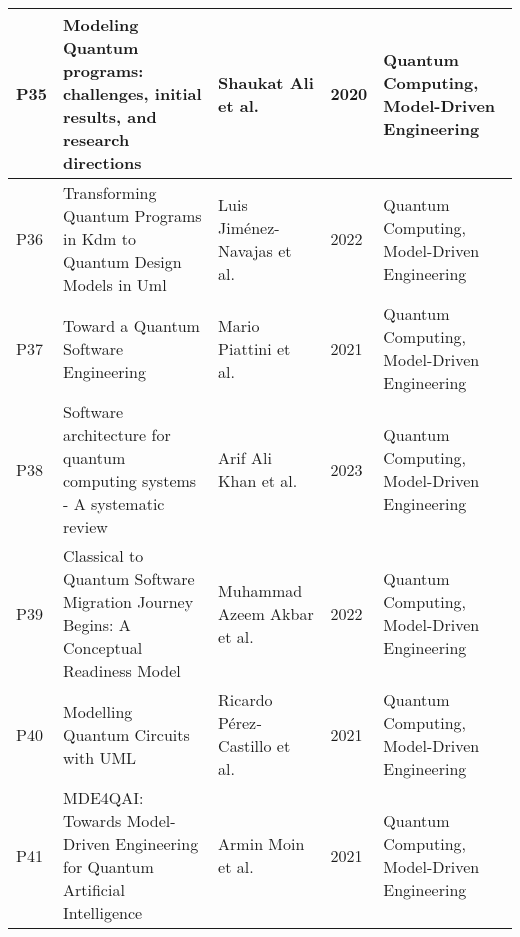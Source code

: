 \begin{longtable}{|m{0.8cm}|m{4.4cm}|m{3cm}|m{0.8cm}|m{4cm}|}
    P35 & Modeling Quantum programs: challenges, initial results, and research directions & Shaukat Ali et al.~\cite{Ali_2020} & 2020 & Quantum Computing, Model-Driven Engineering  \\ \hline
    P36 & Transforming Quantum Programs in Kdm to Quantum Design Models in Uml & Luis Jiménez-Navajas et al.~\cite{Jimenez-Navajas_2022} & 2022 & Quantum Computing, Model-Driven Engineering  \\ \hline
    P37 & Toward a Quantum Software Engineering & Mario Piattini et al.~\cite{Piattini_2021} & 2021 & Quantum Computing, Model-Driven Engineering  \\ \hline
    P38 & Software architecture for quantum computing systems - A systematic review & Arif Ali Khan et al.~\cite{khan2023software} & 2023 & Quantum Computing, Model-Driven Engineering  \\ \hline
    P39 & Classical to Quantum Software Migration Journey Begins: A Conceptual Readiness Model & Muhammad Azeem Akbar et al.~\cite{Akbar_2022} & 2022 & Quantum Computing, Model-Driven Engineering  \\ \hline
    P40 & Modelling Quantum Circuits with UML & Ricardo Pérez‐Castillo et al.~\cite{Perez-Castillo_2021} & 2021 & Quantum Computing, Model-Driven Engineering  \\ \hline
    P41 & MDE4QAI: Towards Model-Driven Engineering for Quantum Artificial Intelligence & Armin Moin et al.~\cite{Moin_2021} & 2021 & Quantum Computing, Model-Driven Engineering  \\ \hline
\end{longtable}

